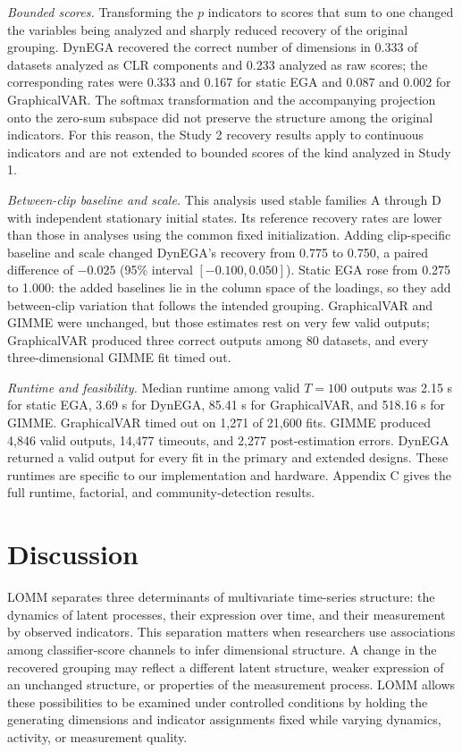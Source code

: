 \documentclass[
]{article}
\begin{document}
\emph{Bounded scores.} Transforming the \(p\) indicators to scores that
sum to one changed the variables being analyzed and sharply reduced
recovery of the original grouping. DynEGA recovered the correct number
of dimensions in 0.333 of datasets analyzed as CLR components and 0.233
analyzed as raw scores; the corresponding rates were 0.333 and 0.167 for
static EGA and 0.087 and 0.002 for GraphicalVAR. The softmax
transformation and the accompanying projection onto the zero-sum
subspace did not preserve the structure among the original indicators.
For this reason, the Study 2 recovery results apply to continuous
indicators and are not extended to bounded scores of the kind analyzed
in Study 1.

\emph{Between-clip baseline and scale.} This analysis used stable
families A through D with independent stationary initial states. Its
reference recovery rates are lower than those in analyses using the
common fixed initialization. Adding clip-specific baseline and scale
changed DynEGA's recovery from 0.775 to 0.750, a paired difference of
\(-0.025\) (95\% interval \([-0.100,0.050]\)). Static EGA rose from
0.275 to 1.000: the added baselines lie in the column space of the
loadings, so they add between-clip variation that follows the intended
grouping. GraphicalVAR and GIMME were unchanged, but those estimates
rest on very few valid outputs; GraphicalVAR produced three correct
outputs among 80 datasets, and every three-dimensional GIMME fit timed
out.

\emph{Runtime and feasibility.} Median runtime among valid \(T=100\)
outputs was 2.15 s for static EGA, 3.69 s for DynEGA, 85.41 s for
GraphicalVAR, and 518.16 s for GIMME. GraphicalVAR timed out on 1,271 of
21,600 fits. GIMME produced 4,846 valid outputs, 14,477 timeouts, and
2,277 post-estimation errors. DynEGA returned a valid output for every
fit in the primary and extended designs. These runtimes are specific to
our implementation and hardware. Appendix C gives the full runtime,
factorial, and community-detection results.

\section{Discussion}\label{discussion}

LOMM separates three determinants of multivariate time-series structure:
the dynamics of latent processes, their expression over time, and their
measurement by observed indicators. This separation matters when
researchers use associations among classifier-score channels to infer
dimensional structure. A change in the recovered grouping may reflect a
different latent structure, weaker expression of an unchanged structure,
or properties of the measurement process. LOMM allows these
possibilities to be examined under controlled conditions by holding the
generating dimensions and indicator assignments fixed while varying
dynamics, activity, or measurement quality.
\end{document}

